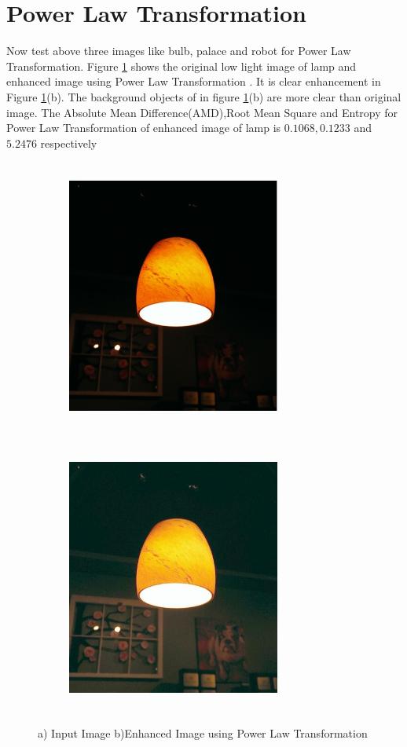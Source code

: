 \section{Power Law Transformation}
Now test above three images like bulb, palace and robot for Power Law Transformation. Figure \ref{fig:powerLaw} shows the original low light image of lamp and enhanced image using Power Law Transformation . It is clear enhancement in Figure \ref{fig:powerLaw}(b). The background objects of in figure \ref{fig:powerLaw}(b) are more clear than original image. The Absolute Mean Difference(AMD),Root Mean Square and Entropy for Power Law Transformation of enhanced image of lamp is $0.1068,0.1233$ and $5.2476$ respectively      


\begin{figure}[!htb]
	\begin{subfigure}{8cm}
		\centering    
    	\includegraphics[width=7cm,height=9cm,keepaspectratio]{images/ch5/bulb_input.jpg}
    	\caption{} 
    \end{subfigure}
  	\begin{subfigure}{6cm}
  		\centering
  		\includegraphics[width=7cm,height=9cm,keepaspectratio]{images/ch5/bulb_power.jpg}
   		\caption{}
  	\end{subfigure}
  	\caption{a) Input Image b)Enhanced Image using Power Law Transformation}
  	\label{fig:powerLaw}
\end{figure}

